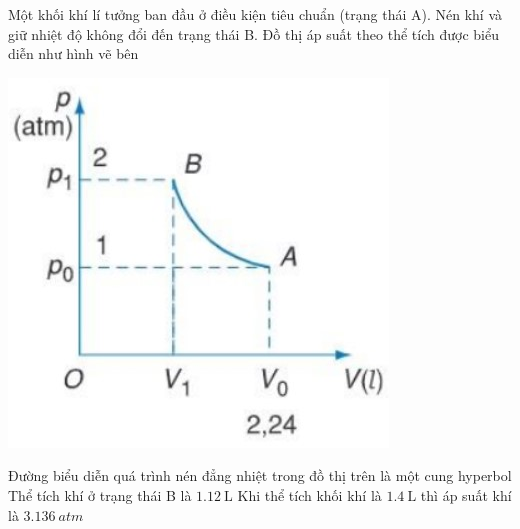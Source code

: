 \begin{ex}
	Một khối khí lí tưởng ban đầu ở điều kiện tiêu chuẩn (trạng thái A). Nén khí và giữ nhiệt độ không đổi đến trạng thái B. Đồ thị áp suất theo thể tích được biểu diễn như hình vẽ bên
	\begin{center}
		\includegraphics[width=0.35\linewidth]{figs/VN12-Y24-PH-SYL-010P-11}
	\end{center}
	{\True Đường biểu diễn quá trình nén đẳng nhiệt trong đồ thị trên là một cung hyperbol}
	{\True Thể tích khí ở trạng thái B là $\SI{1.12}{\liter}$}
	{Khi thể tích khối khí là $\SI{1.4}{\liter}$ thì áp suất khí là $\SI{3.136}{atm}$}
\end{ex}
